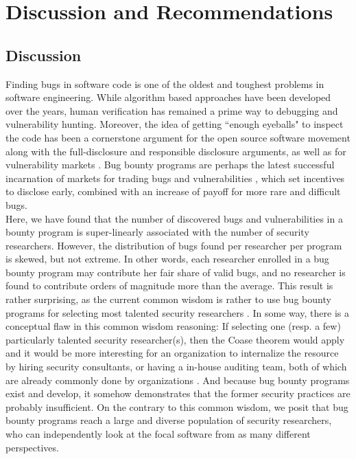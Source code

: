 \section{Discussion and Recommendations}
\label{sec:discussion}

\subsection{Discussion}
Finding bugs in software code is one of the oldest and toughest problems in software engineering. While algorithm based approaches have been developed over the years, human verification has remained a prime way to debugging and vulnerability hunting. Moreover, the idea of getting ``enough eyeballs" to inspect the code has been a cornerstone argument for the open source software movement \cite{raymond1999cathedral} along with the full-disclosure and responsible disclosure arguments, as well as for vulnerability markets \cite{bohme2006comparison}. Bug bounty programs are perhaps the latest successful incarnation of markets for trading bugs and vulnerabilities \cite{bohme2006comparison}, which set incentives to disclose early, combined with an increase of payoff for more rare and difficult bugs.\\

Here, we have found that the number of discovered bugs and vulnerabilities in a bounty program is super-linearly associated with the number of security researchers. However, the distribution of bugs found per researcher per program is skewed, but not extreme. In other words, each researcher enrolled in a bug bounty program may contribute her fair share of valid bugs, and no researcher is found to contribute orders of magnitude more than the average. This result is rather surprising, as the current common wisdom is rather to use bug bounty programs for selecting most talented security researchers \cite{moussouris2016}. In some way, there is a conceptual flaw in this common wisdom reasoning: If selecting one (resp. a few) particularly talented security researcher(s), then the Coase theorem would apply and it would be more interesting for an organization to internalize the resource by hiring security consultants, or having a in-house auditing team, both of which are already commonly done by organizations  \cite{coase1937}. And because bug bounty programs exist and develop, it somehow demonstrates that the former security practices are probably insufficient. On the contrary to this common wisdom, we posit that bug bounty programs reach a large and diverse population of security researchers, who can independently look at the focal software from as many different perspectives. \\

